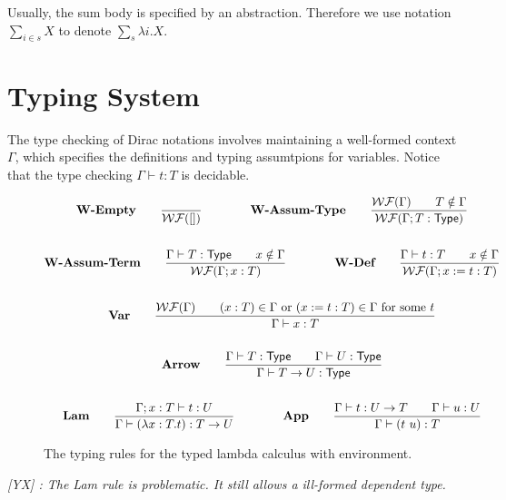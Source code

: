 \documentclass{article}
\newcommand{\yx}[1]{\textit{\color{blue}[YX] : #1}}
\begin{document}
Usually, the sum body is specified by an abstraction. Therefore we use notation $\sum_{i \in s} X$ to denote $\sum_{s} \lambda i . X$.
 
\section{Typing System}
The type checking of Dirac notations involves maintaining a well-formed context $\Gamma$, which specifies the definitions and typing assumtpions for variables.
Notice that the type checking $\Gamma \vdash t : T$ is decidable.
\begin{figure}[h]
    \begin{gather*}
        \textbf{W-Empty} \qquad
        \frac{}{\mathcal{WF}([])}
        \qquad \qquad
        \textbf{W-Assum-Type} \qquad
        \frac{\mathcal{WF}(\Gamma) \qquad T \notin \Gamma}{\mathcal{WF}(\Gamma; T:\mathsf{Type})}\\
        \\
        \textbf{W-Assum-Term} \qquad
        \frac{\Gamma\vdash T:\mathsf{Type} \qquad x \notin \Gamma}{\mathcal{WF}(\Gamma; x:T)}
        \qquad \qquad
        \textbf{W-Def} \qquad
        \frac{\Gamma\vdash t:T \qquad x \notin \Gamma}{\mathcal{WF}(\Gamma; x:=t:T)} \\
        \\
        \textbf{Var} \qquad
        \frac{\mathcal{WF}(\Gamma) \qquad (x:T) \in \Gamma \text{ or } (x := t : T) \in \Gamma \text{ for some $t$}}{\Gamma \vdash x : T} \\
        \\
        \textbf{Arrow} \qquad
        \frac{\Gamma \vdash T:\mathsf{Type} \qquad \Gamma \vdash U:\mathsf{Type}}{\Gamma \vdash T \to U : \mathsf{Type}} \\
        \\
        \textbf{Lam} \qquad
        \frac{\Gamma;x:T \vdash t : U}{\Gamma \vdash (\lambda x:T . t) : T \to U}
        \qquad \qquad
        \textbf{App} \qquad
        \frac{\Gamma \vdash t:U \to T \qquad \Gamma \vdash u:U}{\Gamma \vdash (t\ u):T}
    \end{gather*}
    \caption{The typing rules for the typed lambda calculus with environment.}
\end{figure}
\yx{The Lam rule is problematic. It still allows a ill-formed dependent type.}
\end{document}
